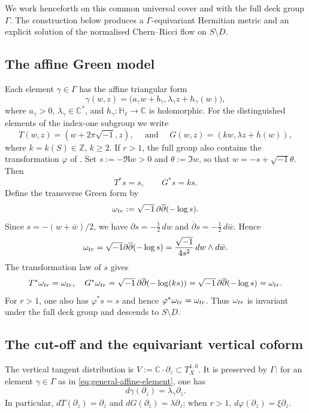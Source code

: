 \documentclass[10pt,a4paper]{amsart}
\numberwithin{equation}{section}
\newcommand{\ddbar}{\sqrt{-1}\,\partial\overline\partial}
\begin{document}
We work henceforth on this common universal cover and with the full deck group $\Gamma$. The construction below produces a $\Gamma$-equivariant Hermitian metric and an explicit solution of the normalised Chern--Ricci flow on $S\setminus D$.

\subsection{The affine Green model}
Each element $\gamma\in\Gamma$ has the affine triangular form
\begin{equation}\label{eq:general-affine-element}
 \gamma(w,z)=\bigl(a_\gamma w+b_\gamma,\lambda_\gamma z+h_\gamma(w)\bigr),
\end{equation}
where $a_\gamma>0$, $\lambda_\gamma\in\mathbb{C}^*$, and $h_\gamma \colon \mathbb H_\ell \to \mathbb C$ is holomorphic.
For the distinguished elements of the index-one subgroup we write
$$ T(w,z)=(w+2\pi\sqrt{-1},z),
\quad \text{ and } \quad
G(w,z)=(kw,\lambda z+h(w)), $$
where $k=k(S)\in\mathbb Z$, $k\geq2$. If $r>1$, the full group also contains the transformation $\varphi$ of .
Set $s:=-\Re w>0$ and $\theta:=\Im w$, so that $w=-s+\sqrt{-1}\theta$.
Then
\begin{equation}\label{eq:s-transforms}
 T^*s=s,
 \qquad
 G^*s=ks.
\end{equation}
Define the transverse Green form by
\begin{equation*}
 \omega_{\rm tr}:=\ddbar(-\log s).
\end{equation*}
Since $s=-(w+\bar w)/2$, we have $\partial s=-\tfrac12\,dw$ and $\overline\partial s=-\tfrac12\,d\bar w$. Hence
$$ \omega_{\rm tr} = \sqrt{-1} \partial\overline\partial (-\log s) =
 \frac{\sqrt{-1}}{4s^2}\,dw\wedge d\bar w. $$
The transformation law of $s$ gives
\begin{equation*}
 T^*\omega_{\rm tr}=\omega_{\rm tr},
 \quad
 G^*\omega_{\rm tr}
 =
 \ddbar(-\log(ks))
 =
 \ddbar(-\log s)
 =
 \omega_{\rm tr}.
\end{equation*}
For $r>1$, one also has $\varphi^*s=s$ and hence $\varphi^*\omega_{\rm tr}=\omega_{\rm tr}$. Thus $\omega_{\rm tr}$ is invariant under the full deck group and descends to $S\setminus D$.


\subsection{The cut-off and the equivariant vertical coform}
The vertical tangent distribution is $V:=\mathbb{C}\cdot\partial_z\subset T_X^{1,0}$.
It is preserved by $\Gamma$: for an element
$\gamma\in\Gamma$ as in \eqref{eq:general-affine-element}, one has
\begin{equation*}
 d\gamma(\partial_z)=\lambda_\gamma\partial_z.
\end{equation*}
In particular, $dT(\partial_z)=\partial_z$ and $dG(\partial_z)=\lambda\partial_z$; when $r>1$, $d\varphi(\partial_z)=\xi\partial_z$.
\end{document}
